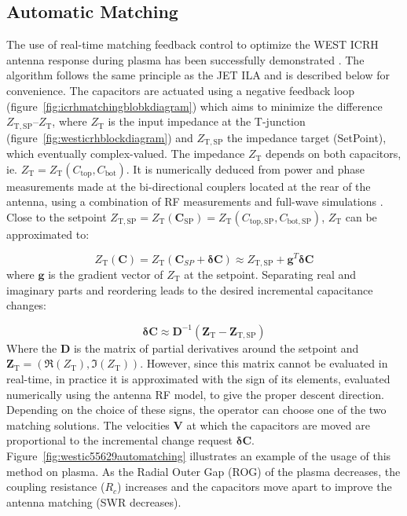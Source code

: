 \documentclass[12p]{iopart}
\newcommand{\ZT}{Z_{\mathrm{T}}}
\newcommand{\ZTSP}{Z_{\mathrm{T,SP}}}
\begin{document}
\subsection{Automatic Matching}


The use of real-time matching feedback control to optimize the WEST ICRH antenna response during plasma has been successfully demonstrated \cite{helou2020}. The algorithm follows the same principle as the JET ILA \cite{durodie2015} and is described below for convenience. The capacitors are actuated using a negative feedback loop (figure~\ref{fig:icrhmatchingblobkdiagram}) which aims to minimize the difference $\ZTSP – \ZT$, where $\ZT$ is the input impedance at the T-junction (figure~\ref{fig:westicrhblockdiagram}) and $\ZTSP$ the impedance target (SetPoint), which eventually complex-valued. The impedance $\ZT$ depends on both capacitors, ie. $\ZT=\ZT(C_{\mathrm{top}}, C_{\mathrm{bot}})$. It is numerically deduced from power and phase measurements made at the bi-directional couplers located at the rear of the antenna, using a combination of RF measurements and full-wave simulations \cite{helou2020}. Close to the setpoint $\ZTSP=\ZT(\mathbf{C}_{\mathrm{SP}}) = \ZT(C_{\mathrm{top,SP}}, C_{\mathrm{bot,SP}})$, $\ZT$ can be approximated to:

\begin{equation}
	\ZT (\mathbf{C}) = \ZT (\mathbf{C}_{SP} +  \mathbf{\delta C})\approx \ZTSP + \mathbf{g}^T  \mathbf{\delta C}
\end{equation}
where $\mathbf{g}$ is the gradient vector of $\ZT$ at the setpoint. Separating real and imaginary parts and reordering leads to the desired incremental capacitance changes:

\begin{equation}
	\mathbf{\delta C} \approx \mathbf{D}^{-1} (\mathbf{\ZT} - \mathbf{\ZTSP})
\end{equation}
Where the $\mathbf{D}$ is the matrix of partial derivatives around the setpoint and $\mathbf{\ZT}=(\Re(\ZT), \Im(\ZT))$. However, since this matrix cannot be evaluated in real-time, in practice it is approximated with the sign of its elements, evaluated numerically using the antenna RF model, to give the proper descent direction. Depending on the choice of these signs, the operator can choose one of the two matching solutions. The velocities $\mathbf{V}$ at which the capacitors are moved are proportional to the incremental change request $\mathbf{\delta C}$. Figure~\ref{fig:westic55629automatching} illustrates an example of the usage of this method on plasma. As the Radial Outer Gap (ROG) of the plasma decreases, the coupling resistance ($R_c$) increases and the capacitors move apart to improve the antenna matching (SWR decreases).
\end{document}
